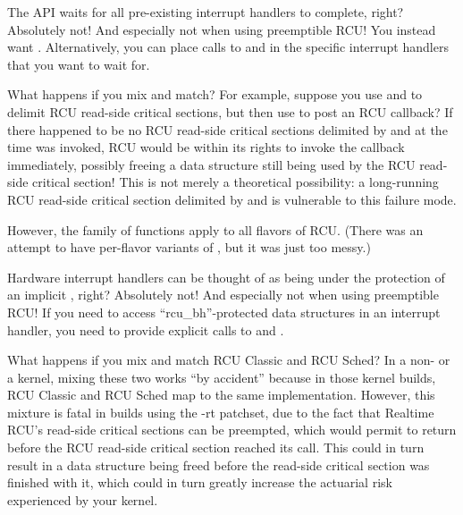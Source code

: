 \QuickQ{}
	The  API waits for all pre-existing
	interrupt handlers to complete, right?
\QuickA{}
	Absolutely not!
	And especially not when using preemptible RCU!
	You instead want .
	Alternatively, you can place calls to 
	and  in the specific interrupt handlers that
	you want  to wait for.

\QuickQ{}
	What happens if you mix and match?
	For example, suppose you use  and
	 to delimit RCU read-side critical
	sections, but then use  to post an
	RCU callback?
\QuickA{}
	If there happened to be no RCU read-side critical
	sections delimited by  and
	 at the time 
	was invoked, RCU would be within its rights to invoke the callback
	immediately, possibly freeing a data structure still being used by
	the RCU read-side critical section!
	This is not merely a theoretical possibility: a long-running RCU
	read-side critical section delimited by 
	and  is vulnerable to this failure mode.

	However, the  family of functions apply
	to all flavors of RCU.
	(There was an attempt to have per-flavor variants of
	, but it was just too messy.)

\QuickQ{}
	Hardware interrupt handlers can be thought of as being
	under the protection of an implicit ,
	right?
\QuickA{}
	Absolutely not!
	And especially not when using preemptible RCU!
	If you need to access ``rcu\_bh''-protected data structures
	in an interrupt handler, you need to provide explicit calls to
	 and .

\QuickQ{}
	What happens if you mix and match RCU Classic and RCU Sched?
\QuickA{}
	In a non- or a  kernel, mixing these
	two works ``by accident'' because in those kernel builds, RCU Classic
	and RCU Sched map to the same implementation.
	However, this mixture is fatal in  builds using the -rt
	patchset, due to the fact that Realtime RCU's read-side critical
	sections can be preempted, which would permit
	 to return before the
	RCU read-side critical section reached its 
	call.
	This could in turn result in a data structure being freed before the
	read-side critical section was finished with it,
	which could in turn greatly increase the actuarial risk experienced
	by your kernel.

